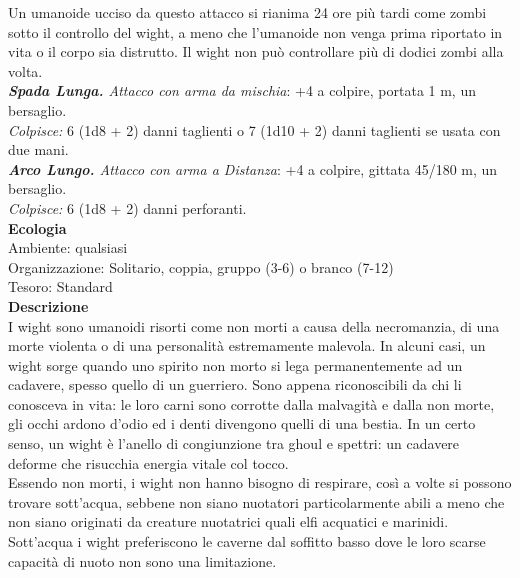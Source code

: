 \begin{multicols}{2}
Un umanoide ucciso da questo attacco si rianima 24 ore più tardi come zombi sotto il controllo del wight, a meno che l'umanoide non venga prima riportato in vita o il corpo sia distrutto. Il wight non può controllare più di dodici zombi alla volta.\\

\emph{\textbf{Spada Lunga.} Attacco con arma da mischia}: +4 a colpire, portata 1 m, un bersaglio.\\
\emph{Colpisce:} 6 (1d8 + 2) danni taglienti o 7 (1d10 + 2) danni taglienti se usata con due mani.\\
\emph{\textbf{Arco Lungo.} Attacco con arma a Distanza}: +4 a colpire, gittata 45/180 m, un bersaglio.\\
\emph{Colpisce:} 6 (1d8 + 2) danni perforanti.\\
\textbf{Ecologia}\\
Ambiente: qualsiasi\\
Organizzazione: Solitario, coppia, gruppo (3-6) o branco (7-12)\\
Tesoro: Standard\\
\textbf{Descrizione}\\
I wight sono umanoidi risorti come non morti a causa della necromanzia, di una morte violenta o di una personalità estremamente malevola. In alcuni casi, un wight sorge quando uno spirito non morto si lega permanentemente ad un cadavere, spesso quello di un guerriero. Sono appena riconoscibili da chi li conosceva in vita: le loro carni sono corrotte dalla malvagità e dalla non morte, gli occhi ardono d’odio ed i denti divengono quelli di una bestia. In un certo senso, un wight è l’anello di congiunzione tra ghoul e spettri: un cadavere deforme che risucchia energia vitale col tocco.\\

Essendo non morti, i wight non hanno bisogno di respirare, così a volte si possono trovare sott’acqua, sebbene non siano nuotatori particolarmente abili a meno che non siano originati da creature nuotatrici quali elfi acquatici e marinidi. Sott’acqua i wight preferiscono le caverne dal soffitto basso dove le loro scarse capacità di nuoto non sono una limitazione.\\


\end{multicols}
